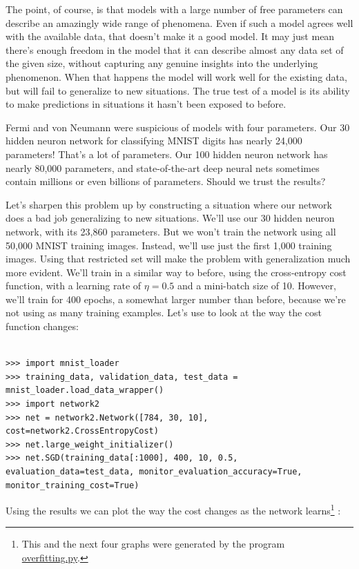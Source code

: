 \documentclass[a4paper,twoside,10pt]{book}
\begin{document}
The point, of course, is that models with a large number of free parameters can describe an amazingly wide range of phenomena. Even if such a model agrees well with the available data, that doesn't make it a good model. It may just mean there's enough freedom in the model that it can describe almost any data set of the given size, without capturing any genuine insights into the underlying phenomenon. When that happens the model will work well for the existing data, but will fail to generalize to new situations. The true test of a model is its ability to make predictions in situations it hasn't been exposed to before.

Fermi and von Neumann were suspicious of models with four parameters. Our 30 hidden neuron network for classifying MNIST digits has nearly 24,000 parameters! That's a lot of parameters. Our 100 hidden neuron network has nearly 80,000 parameters, and state-of-the-art deep neural nets sometimes contain millions or even billions of parameters. Should we trust the results?

Let's sharpen this problem up by constructing a situation where our network does a bad job generalizing to new situations. We'll use our 30 hidden neuron network, with its 23,860 parameters. But we won't train the network using all 50,000 MNIST training images. Instead, we'll use just the first 1,000 training images. Using that restricted set will make the problem with generalization much more evident. We'll train in a similar way to before, using the cross-entropy cost function, with a learning rate of $\eta=0.5$ and a mini-batch size of 10. However, we'll train for 400 epochs, a somewhat larger number than before, because we're not using as many training examples. Let's use  to look at the way the cost function changes:


\begin{lstlisting}

>>> import mnist_loader 
>>> training_data, validation_data, test_data = mnist_loader.load_data_wrapper()
>>> import network2 
>>> net = network2.Network([784, 30, 10], cost=network2.CrossEntropyCost) 
>>> net.large_weight_initializer()
>>> net.SGD(training_data[:1000], 400, 10, 0.5, evaluation_data=test_data, monitor_evaluation_accuracy=True, monitor_training_cost=True)
\end{lstlisting}
Using the results we can plot the way the cost changes as the network learns\footnote{This and the next four graphs were generated by the program \href{https://github.com/mnielsen/neural-networks-and-deep-learning/blob/master/fig/overfitting.py}{overfitting.py}.} :
\end{document}
